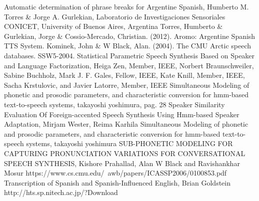 \begin{thebibliography}{9}

 Automatic determination of phrase breaks for Argentine Spanish, Humberto M. Torres \& Jorge A. Gurlekian, Laboratorio de Investigaciones Sensoriales CONICET, University of Buenos Aires, Argentina
 Torres, Humberto \& Gurlekian, Jorge \& Cossio-Mercado, Christian. (2012). Aromo: Argentine Spanish TTS System.
 Kominek, John \& W Black, Alan. (2004). The CMU Arctic speech databases. SSW5-2004.
 Statistical Parametric Speech Synthesis Based on Speaker and Language Factorization, Heiga Zen, Member, IEEE, Norbert Braunschweiler, Sabine Buchholz, Mark J. F. Gales, Fellow, IEEE, Kate Knill, Member, IEEE, Sacha Krstulovic, and Javier Latorre, Member, IEEE
 Simultaneous Modeling of phonetic and prosodic parameters, and characteristic conversion for hmm-based text-to-speech systems, takayoshi yoshimura, pag. 28
 Speaker Similarity Evaluation Of Foreign-accented Speech Synthesis Using Hmm-based Speaker Adaptation, Mirjam Wester, Reima Karhila
 Simultaneous Modeling of phonetic and prosodic parameters, and characteristic conversion for hmm-based text-to-speech systems, takayoshi yoshimura
 SUB-PHONETIC MODELING FOR CAPTURING PRONUNCIATION VARIATIONS FOR CONVERSATIONAL SPEECH SYNTHESIS, Kishore Prahallad, Alan W Black and Ravishankhar Mosur https://www.cs.cmu.edu/~awb/papers/ICASSP2006/0100853.pdf
 Transcription of Spanish and Spanish-Influenced English, Brian Goldstein
 http://hts.sp.nitech.ac.jp/?Download
\end{thebibliography}